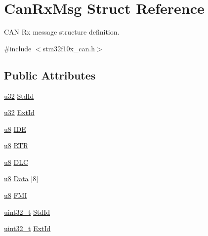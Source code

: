 \hypertarget{struct_can_rx_msg}{}\section{Can\+Rx\+Msg Struct Reference}
\label{struct_can_rx_msg}


C\+AN Rx message structure definition.  




{\ttfamily \#include $<$stm32f10x\+\_\+can.\+h$>$}

\subsection*{Public Attributes}
\begin{DoxyCompactItemize}
\item 
\hyperlink{agilefox_2library_2inc_2stm32f10x__type_8h_a2caf5cd7bcdbe1eefa727f44ffb10bac}{u32} \hyperlink{struct_can_rx_msg_a626ff5c3d696476c786ca999d10f2fa0}{Std\+Id}
\item 
\hyperlink{agilefox_2library_2inc_2stm32f10x__type_8h_a2caf5cd7bcdbe1eefa727f44ffb10bac}{u32} \hyperlink{struct_can_rx_msg_a17367a63ec9c4645a24e83ef95645743}{Ext\+Id}
\item 
\hyperlink{agilefox_2library_2inc_2stm32f10x__type_8h_aed742c436da53c1080638ce6ef7d13de}{u8} \hyperlink{struct_can_rx_msg_a31cfd2e1bc0d038119b4a57eac635dfe}{I\+DE}
\item 
\hyperlink{agilefox_2library_2inc_2stm32f10x__type_8h_aed742c436da53c1080638ce6ef7d13de}{u8} \hyperlink{struct_can_rx_msg_a513971b0413990519a1c45d5afe9b0af}{R\+TR}
\item 
\hyperlink{agilefox_2library_2inc_2stm32f10x__type_8h_aed742c436da53c1080638ce6ef7d13de}{u8} \hyperlink{struct_can_rx_msg_acd3c944910b56789d759a05d85660773}{D\+LC}
\item 
\hyperlink{agilefox_2library_2inc_2stm32f10x__type_8h_aed742c436da53c1080638ce6ef7d13de}{u8} \hyperlink{struct_can_rx_msg_a874252ee64abf660f9165b25773c2ada}{Data} \mbox{[}8\mbox{]}
\item 
\hyperlink{agilefox_2library_2inc_2stm32f10x__type_8h_aed742c436da53c1080638ce6ef7d13de}{u8} \hyperlink{struct_can_rx_msg_abe3f86b0e9ff56fe0e7b0af915a93425}{F\+MI}
\item 
\hyperlink{_p_e___types_8h_a33594304e786b158f3fb30289278f5af}{uint32\+\_\+t} \hyperlink{struct_can_rx_msg_a62769e18836146f71238bee6b43b531e}{Std\+Id}
\item 
\hyperlink{_p_e___types_8h_a33594304e786b158f3fb30289278f5af}{uint32\+\_\+t} \hyperlink{struct_can_rx_msg_a1fdca10d31c81eea2ccef41d2aced562}{Ext\+Id}

\end{DoxyCompactItemize}

